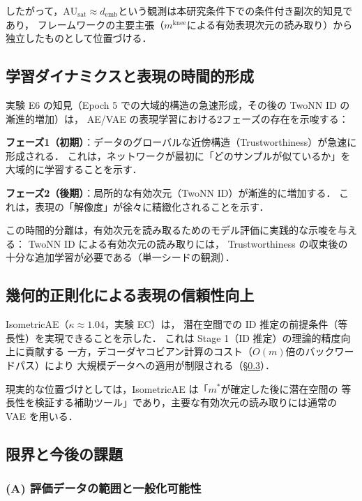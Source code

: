 \documentclass[11pt,a4paper]{jsarticle}
\newcommand{\dzopt}{m^*}
\newcommand{\kap}{\kappa}
\newcommand{\AUsat}{\mathrm{AU}_{\mathrm{sat}}}
\newcommand{\mknee}{m^{\mathrm{knee}}}
\newcommand{\demb}{d_{\mathrm{emb}}}
\begin{document}
したがって，$\AUsat \approx \demb$という観測は本研究条件下での条件付き副次的知見であり，
フレームワークの主要主張（$\mknee$による有効表現次元の読み取り）から独立したものとして位置づける．

\subsection{学習ダイナミクスと表現の時間的形成}\label{sec:disc_dynamics}

実験 E6 の知見（Epoch 5 での大域的構造の急速形成，その後の TwoNN ID の漸進的増加）は，
AE/VAE の表現学習における2フェーズの存在を示唆する：

\textbf{フェーズ1（初期）}：データのグローバルな近傍構造（Trustworthiness）が急速に形成される．
これは，ネットワークが最初に「どのサンプルが似ているか」を大域的に学習することを示す．

\textbf{フェーズ2（後期）}：局所的な有効次元（TwoNN ID）が漸進的に増加する．
これは，表現の「解像度」が徐々に精緻化されることを示す．

この時間的分離は，有効次元を読み取るためのモデル評価に実践的な示唆を与える：
TwoNN ID による有効次元の読み取りには，
Trustworthiness の収束後の十分な追加学習が必要である（単一シードの観測）．

\subsection{幾何的正則化による表現の信頼性向上}\label{sec:disc_isometric}

IsometricAE（$\kap \approx 1.04$，実験 EC）は，
潜在空間での ID 推定の前提条件（等長性）を実現できることを示した．
これは Stage 1（ID 推定）の理論的精度向上に貢献する
一方，デコーダヤコビアン計算のコスト（$O(m)$倍のバックワードパス）により
大規模データへの適用が制限される（§\ref{sec:disc_limitation}）．

現実的な位置づけとしては，IsometricAE は「$\dzopt$が確定した後に潜在空間の
等長性を検証する補助ツール」であり，主要な有効次元の読み取りには通常の VAE を用いる．

\subsection{限界と今後の課題}\label{sec:disc_limitation}

\subsubsection*{(A) 評価データの範囲と一般化可能性}
\end{document}
